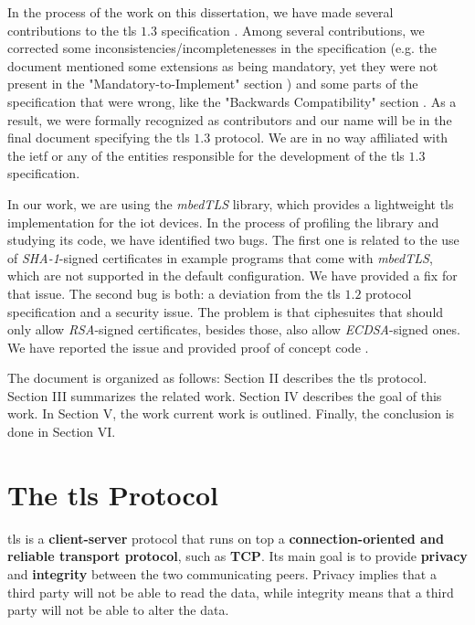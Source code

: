 \documentclass[conference]{IEEEtran}
\begin{document}
In the process of the work on this dissertation, we have made several
contributions to the \gls{tls} $1.3$ specification \cite{PullRequ68:online}. Among
several contributions, we corrected some
inconsistencies/incompletenesses in the specification (e.g.
the document mentioned some extensions as being mandatory, yet they
were not present in the "Mandatory-to-Implement" section \cite{addmessa28:online}) and some parts of the specification that
were wrong, like the "Backwards Compatibility" section \cite{fixBackw47:online}. As a result, we were formally recognized as contributors and our name will be in the final document specifying the
\gls{tls} $1.3$ protocol. We are in no way affiliated with the
\gls{ietf} or any of the entities responsible for the development of
the \gls{tls} $1.3$ specification.

In our work, we are using the \textit{mbedTLS} library\cite{SSLLibra89:online}, which provides
a lightweight \gls{tls} implementation for the \gls{iot} devices.
In the process of profiling the library and studying its code, we
have identified two bugs. The first one is related to the use of
\textit{SHA-1}-signed certificates\cite{updatete80:online} in example
programs that come with \textit{mbedTLS}, which are not supported in the
default configuration. We have provided a fix for that issue\cite{updatete80:online}. The second bug is both: a deviation from the
\gls{tls} $1.2$ protocol specification and a security issue. The problem
is that ciphesuites that should only allow \textit{RSA}-signed certificates,
besides those, also allow \textit{ECDSA}-signed ones. We have reported the
issue and provided proof of concept code \cite{TLSECDHR77:online}.

The document is organized as follows: Section II describes the \gls{tls} protocol. Section III summarizes the related work. Section IV describes the goal of this work. In Section V, the work current work is outlined. Finally, the conclusion is done in Section VI.

\section{The \gls{tls} Protocol}

\gls{tls} is a \textbf{client-server} protocol
that runs on top a \textbf{connection-oriented and reliable transport protocol},
such as \textbf{TCP}. Its main goal is to provide \textbf{privacy} and \textbf{integrity}
between the two communicating peers. Privacy implies that a third party will not
be able to read the data, while integrity means that a third party will not be
able to alter the data.
\end{document}
